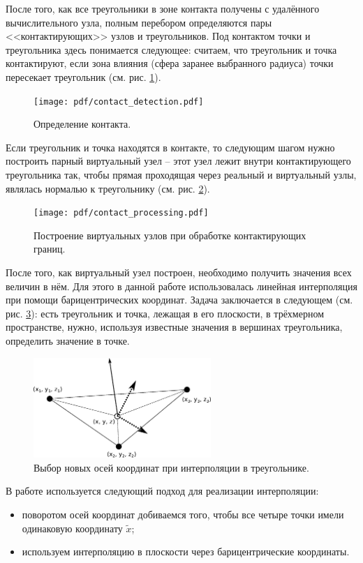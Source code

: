 После того, как все треугольники в зоне контакта получены с удалённого вычислительного узла, полным перебором определяются пары <<контактирующих>> узлов и треугольников. Под контактом точки и треугольника здесь понимается следующее: считаем, что треугольник и точка контактируют, если зона влияния (сфера заранее выбранного радиуса) точки пересекает треугольник (см. рис. \ref{pic:contact_detection}).
\begin{figure}[htp]
\centering
\texttt{[image: pdf/contact\_detection.pdf]}
\caption{Определение контакта.}
\label{pic:contact_detection}
\end{figure}
Если треугольник и точка находятся в контакте, то следующим шагом нужно построить парный виртуальный узел -- этот узел лежит внутри контактирующего треугольника так, чтобы прямая проходящая через реальный и виртуальный узлы, являлась нормалью к треугольнику (см. рис. \ref{pic:contact_processing}).
\begin{figure}[htp]
\centering
\texttt{[image: pdf/contact\_processing.pdf]}
\caption{Построение виртуальных узлов при обработке контактирующих границ.}
\label{pic:contact_processing}
\end{figure}
После того, как виртуальный узел построен, необходимо получить значения всех величин в нём. Для этого в данной работе использовалась линейная интерполяция при помощи барицентрических координат. Задача заключается в следующем (см. рис. \ref{pic:triangle_interpolation}): есть треугольник и точка, лежащая в его плоскости, в трёхмерном пространстве, нужно, используя известные значения в вершинах треугольника, определить значение в точке.
\begin{figure}[htp]
\centering
\includegraphics[width=0.6\textwidth]{eps/triangle_interpolation.eps}
\caption{Выбор новых осей координат при интерполяции в треугольнике.}
\label{pic:triangle_interpolation}
\end{figure}
В работе используется следующий подход для реализации интерполяции:
\begin{itemize}
	\item поворотом осей координат добиваемся того, чтобы все четыре точки имели одинаковую координату $\tilde{x}$;
	\item используем интерполяцию в плоскости через барицентрические координаты.
\end{itemize}
